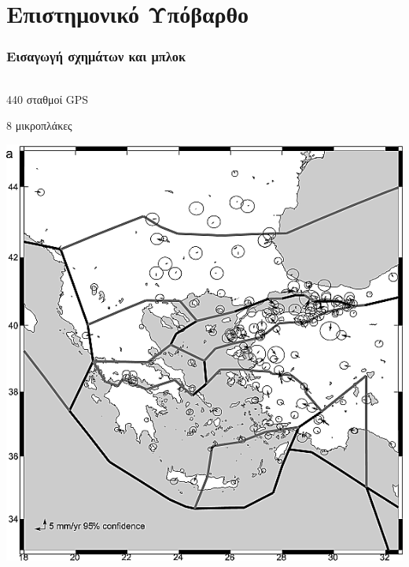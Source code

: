 \section{Επιστημονικό Υπόβαρθο}
 
\graphicspath{{Chapter2/Figs/Vector/}{Chapter2/Figs/Raster/}}

\begin{frame}[t]
  \frametitle{Εισαγωγή σχημάτων και μπλοκ}
  \framesubtitle{}
  \label{fr2:satgeod3}
\begin{columns}
  \begin{column}{.48\textwidth}
    \begin{block}{\textcite{Reilinger2006}}
      440 σταθμοί GPS\par
      8 μικροπλάκες
    \end{block}
    \centering
    \includegraphics[width=.84\linewidth]{reilinger06_8bl.png}
  \end{column}
\end{columns}
\end{frame}
